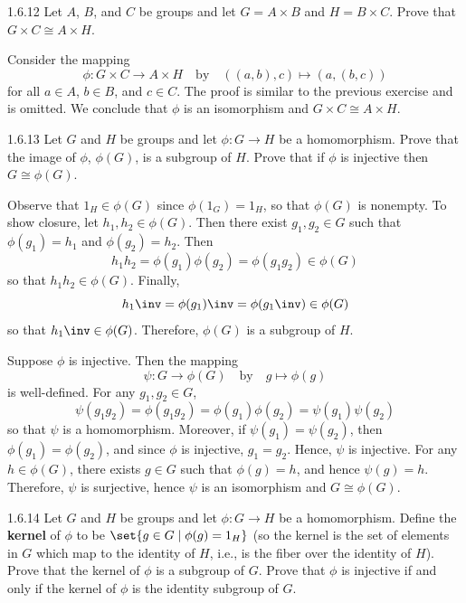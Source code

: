 \begin{exercise}{1.6.12}
    Let $A$, $B$, and $C$ be groups and let $G = A \times B$ and $H = B \times C$.
	Prove that $G \times C \cong A \times H$.
\end{exercise}

\begin{sol}
    Consider the mapping
    \[
    	\phi : G \times C \to A \times H \quad \text{by} \quad ((a, b), c) \mapsto (a, (b, c))
    \]
    for all $a \in A$, $b \in B$, and $c \in C$.
	The proof is similar to the previous exercise and is omitted.
    We conclude that $\phi$ is an isomorphism and $G \times C \cong A \times H$.
\end{sol}

\begin{spex}{1.6.13}
    Let $G$ and $H$ be groups and let $\phi : G \to H$ be a homomorphism.
	Prove that the image of $\phi$, $\phi(G)$, is a subgroup of $H$.
	Prove that if $\phi$ is injective then $G \cong \phi(G)$.
\end{spex}

\begin{sol}[spsol]
    Observe that $1_H \in \phi(G)$ since $\phi(1_G) = 1_H$, so that $\phi(G)$ is nonempty.
	To show closure, let $h_1, h_2 \in \phi(G)$.
	Then there exist $g_1, g_2 \in G$ such that $\phi(g_1) = h_1$ and $\phi(g_2) = h_2$.
	Then
    \[
    	h_1h_2 = \phi(g_1)\phi(g_2) = \phi(g_1g_2) \in \phi(G)
    \]
    so that $h_1h_2 \in \phi(G)$.
	Finally,
    \[
    	h_1\inv = \phi(g_1)\inv = \phi(g_1\inv) \in \phi(G)
    \]
    so that $h_1\inv \in \phi(G)$.
	Therefore, $\phi(G)$ is a subgroup of $H$.

    Suppose $\phi$ is injective.
	Then the mapping
    \[
    	\psi : G \to \phi(G) \quad \text{by} \quad g \mapsto \phi(g)
    \]
    is well-defined.
	For any $g_1, g_2 \in G$,
    \[
    	\psi(g_1g_2) = \phi(g_1g_2) = \phi(g_1)\phi(g_2) = \psi(g_1)\psi(g_2)
    \]
    so that $\psi$ is a homomorphism.
	Moreover, if $\psi(g_1) = \psi(g_2)$, then $\phi(g_1) = \phi(g_2)$, and since $\phi$ is injective, $g_1 = g_2$.
	Hence, $\psi$ is injective.
	For any $h \in \phi(G)$, there exists $g \in G$ such that $\phi(g) = h$, and hence $\psi(g) = h$.
	Therefore, $\psi$ is surjective, hence $\psi$ is an isomorphism and $G \cong \phi(G)$.
\end{sol}

\begin{spex}{1.6.14}
    Let $G$ and $H$ be groups and let $\phi : G \to H$ be a homomorphism.
	Define the \textbf{kernel} of $\phi$ to be $\set{ g \in G \mid \phi(g) = 1_H }$ (so the kernel is the set of elements in $G$ which map to the identity of $H$, i.e., is the fiber over the identity of $H$).
	Prove that the kernel of $\phi$ is a subgroup of $G$.
	Prove that $\phi$ is injective if and only if the kernel of $\phi$ is the identity subgroup of $G$.
\end{spex}

